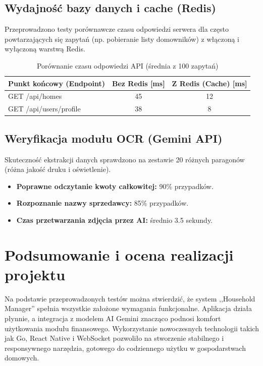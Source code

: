 \subsection{Wydajność bazy danych i cache (Redis)}

Przeprowadzono testy porównawcze czasu odpowiedzi serwera dla często powtarzających się zapytań (np. pobieranie listy domowników) z włączoną i wyłączoną warstwą Redis.

\begin{table}[H]
\centering
\caption{Porównanie czasu odpowiedzi API (średnia z 100 zapytań)}
\begin{tabular}{|l|c|c|}
\hline
\textbf{Punkt końcowy (Endpoint)} & \textbf{Bez Redis [ms]} & \textbf{Z Redis (Cache) [ms]} \\ \hline
GET /api/homes                   & 45                      & 12                            \\ \hline
GET /api/users/profile           & 38                      & 8                             \\ \hline
\end{tabular}
\label{tab:perf_redis}
\end{table}

\subsection{Weryfikacja modułu OCR (Gemini API)}

Skuteczność ekstrakcji danych sprawdzono na zestawie 20 różnych paragonów (różna jakość druku i oświetlenie).

\begin{itemize}
    \item \textbf{Poprawne odczytanie kwoty całkowitej:} 90\% przypadków.
    \item \textbf{Rozpoznanie nazwy sprzedawcy:} 85\% przypadków.
    \item \textbf{Czas przetwarzania zdjęcia przez AI:} średnio 3.5 sekundy.
\end{itemize}

\section{Podsumowanie i ocena realizacji projektu}

Na podstawie przeprowadzonych testów można stwierdzić, że system ,,Household Manager'' spełnia wszystkie założone wymagania funkcjonalne. Aplikacja działa płynnie, a integracja z modelem AI Gemini znacząco podnosi komfort użytkowania modułu finansowego. Wykorzystanie nowoczesnych technologii takich jak Go, React Native i WebSocket pozwoliło na stworzenie stabilnego i responsywnego narzędzia, gotowego do codziennego użytku w gospodarstwach domowych.
